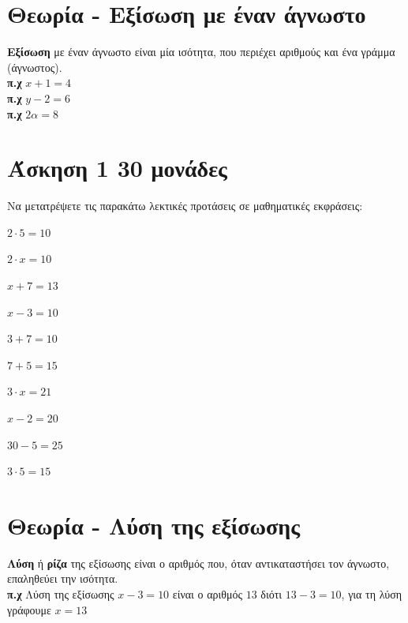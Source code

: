 \documentclass[a4paper,10pt]{report}
\begin{document}
\section*{Θεωρία - Εξίσωση με έναν άγνωστο \hfill \small{}}
\textbf{Εξίσωση} με έναν άγνωστο είναι μία ισότητα, που περιέχει αριθμούς και ένα γράμμα (άγνωστος).\\
\textbf{π.χ} $x+1=4$\\
\textbf{π.χ} $y-2=6$\\
\textbf{π.χ} $2α=8$\\



\section*{Άσκηση 1  \hfill \small{30 μονάδες}}
Να μετατρέψετε τις παρακάτω λεκτικές προτάσεις σε μαθηματικές εκφράσεις:
\begin{enumerate}[1)]
\begin{multicols}{2}
 \item $2\cdot 5 =10$
 \item $2\cdot x =10$
 \item $x+7=13$
 \item $x-3=10$
 \item $3+7=10$
 \item $7+5=15$
 \item $3\cdot x=21$
 \item $x-2=20$
 \item $30-5=25$
 \item $3\cdot 5=15$
\end{multicols}
\end{enumerate}




\section*{Θεωρία - Λύση της εξίσωσης \hfill \small{}}
\textbf{Λύση} ή \textbf{ρίζα} της εξίσωσης είναι ο αριθμός που, όταν αντικαταστήσει τον άγνωστο, 
επαληθεύει την ισότητα.\\
\textbf{π.χ} Λύση της εξίσωσης $x-3=10$ είναι ο αριθμός $13$ διότι $13-3=10$, για τη λύση γράφουμε $x=13$
\end{document}
